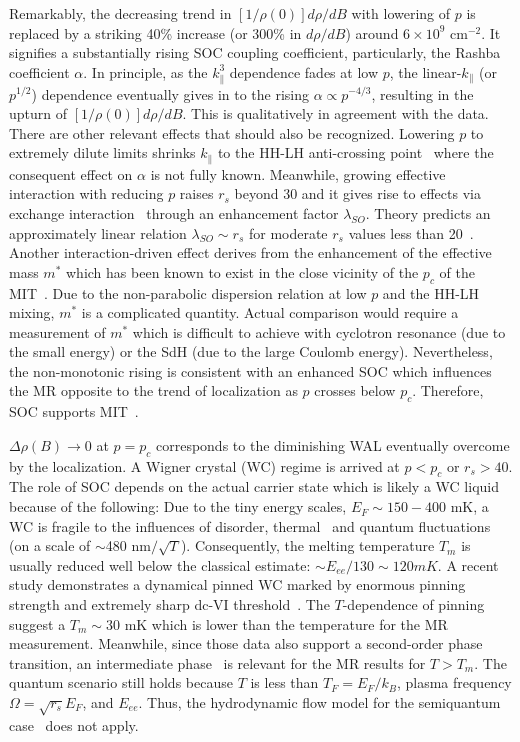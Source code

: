 \documentclass[twocolumn,secnumarabic,amssymb, nobibnotes, aps, prd]{revtex4-1}
\begin{document}
Remarkably, the decreasing trend in $[1/\rho(0)]d\rho/dB$ with lowering of $p$ is replaced by a striking 40\% increase (or 300\% in $d\rho/dB$) around $6\times10^{9}$ cm$^{-2}$. It signifies a substantially rising SOC coupling coefficient, particularly, the Rashba coefficient $\alpha$. In principle, as the $k_{\parallel}^3$ dependence fades at low $p$, the linear-$k_{\parallel}$ (or $p^{1/2}$) dependence eventually gives in to the rising $\alpha\propto p^{-4/3}$, resulting in the upturn of $[1/\rho(0)]d\rho/dB$. This is qualitatively in agreement with the data. There are other relevant effects that should also be recognized. Lowering $p$ to extremely dilute limits shrinks $k_{\parallel}$ to the HH-LH anti-crossing point~\cite{mixing} where the consequent effect on $\alpha$ is not fully known. Meanwhile, growing effective interaction with reducing $p$ raises $r_s$ beyond 30 and it gives rise to effects via exchange interaction~\cite{Utah} through an enhancement factor $\lambda_{SO}$. Theory predicts an approximately linear relation $\lambda_{SO}\sim r_s$ for moderate $r_s$ values less than 20~\cite{Utah}. Another interaction-driven effect derives from the enhancement of the effective mass $m^*$ which has been known to exist in the close vicinity of the $p_c$ of the MIT~\cite{AKS-review}. Due to the non-parabolic dispersion relation at low $p$ and the HH-LH mixing, $m^*$ is a complicated quantity. Actual comparison would require a measurement of $m^*$ which is difficult to achieve with cyclotron resonance (due to the small energy) or the SdH (due to the large Coulomb energy). Nevertheless, the non-monotonic rising is consistent with an enhanced SOC which influences the MR opposite to the trend of localization as $p$ crosses below $p_c$. Therefore, SOC supports MIT~\cite{pudalovSOC}.

$\Delta\rho(B)\rightarrow 0$ at $p=p_c$ corresponds to the diminishing WAL eventually overcome by the localization. A Wigner crystal (WC) regime is arrived at $p<p_c$ or $r_s>40$. The role of SOC depends on the actual carrier state which is likely a WC liquid because of the following: Due to the tiny energy scales, $E_F\sim 150-400$ mK, a WC is fragile to the influences of disorder, thermal~\cite{mermin-wagner} and quantum fluctuations (on a scale of $\sim$480 nm$/\sqrt{T}$). Consequently, the melting temperature $T_m$ is usually reduced well below the classical estimate: $\sim E_{ee}/130\sim 120 mK$. A recent study demonstrates a dynamical pinned WC marked by enormous pinning strength and extremely sharp dc-VI threshold~\cite{exp}. The $T$-dependence of pinning suggest a $T_m\sim 30$ mK which is lower than the temperature for the MR measurement. Meanwhile, since those data also support a second-order phase transition, an intermediate phase~\cite{spivak-kivelson} is relevant for the MR results for $T>T_m$. The quantum scenario still holds because $T$ is less than $T_F=E_F/k_B$, plasma frequency $\Omega=\sqrt{r_s}E_F$, and $E_{ee}$. Thus, the hydrodynamic flow model for the semiquantum case~\cite{andreev78,andreev11} does not apply. 
\end{document}
